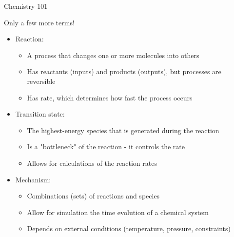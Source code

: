 \begin{frame}{Chemistry 101}

Only a few more terms!

\vspace{12pt}
 \begin{itemize}

  \item Reaction:
  \begin{itemize}
  	\item A process that changes one or more molecules into others
  	\item Has reactants (inputs) and products (outputs), but processes are reversible
  	\item Has rate, which determines how fast the process occurs
  \end{itemize}
  
  \item Transition state:
  \begin{itemize}
  	\item The highest-energy species that is generated during the reaction
  	\item Is a "bottleneck" of the reaction - it controls the rate
  	\item Allows for calculations of the reaction rates
  \end{itemize}
  
  \item Mechanism:
  \begin{itemize}
  	\item Combinations (sets) of reactions and species
  	\item Allow for simulation the time evolution of a chemical system
  	\item Depends on external conditions (temperature, pressure, constraints)
  \end{itemize}

 \end{itemize}
 
\end{frame}

